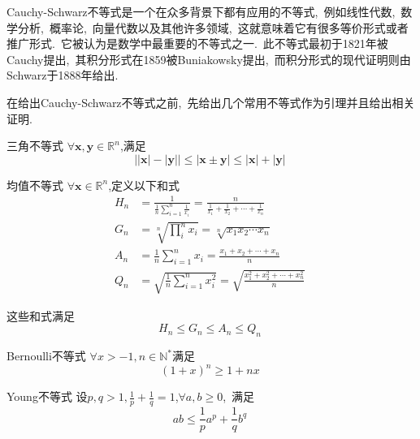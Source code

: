 
\begin{issues}
\end{issues}

Cauchy-Schwarz不等式是一个在众多背景下都有应用的不等式,\ 例如线性代数,\ 数学分析,\ 概率论,\ 向量代数以及其他许多领域,\ 这就意味着它有很多等价形式或者推广形式.\ 它被认为是数学中最重要的不等式之一.\ 此不等式最初于1821年被Cauchy提出,\ 其积分形式在1859被Buniakowsky提出,\ 而积分形式的现代证明则由Schwarz于1888年给出.\ 

在给出Cauchy-Schwarz不等式之前,\ 先给出几个常用不等式作为引理并且给出相关证明.\ 
\begin{lemma}{三角不等式}
$\forall \boldsymbol{x},\boldsymbol{y}\in\mathbb{R}^n$,满足
\begin{equation}
\lvert\lvert\boldsymbol{x}\rvert-\lvert\boldsymbol{y}\rvert\rvert\leqslant\lvert\boldsymbol{x}\pm\boldsymbol{y}\rvert\leqslant\lvert\boldsymbol{x}\rvert+\lvert\boldsymbol{y}\rvert~
\end{equation}
\end{lemma}
\begin{lemma}{均值不等式}
$\forall \boldsymbol{x}\in\mathbb{R}^n$,定义以下和式
\begin{align}
H_n&=\frac{1}{\frac{1}{n}\sum\limits_{i=1}^n\frac{1}{x_i}}=\frac{n}{\frac{1}{x_1}+\frac{1}{x_2}+\cdots+\frac{1}{x_n}}\\
G_n&=\sqrt[n]{\prod_{i}^n x_i}=\sqrt[n]{x_1x_2\cdots x_n}\\
A_n&=\frac{1}{n}\sum_{i=1}^n x_i=\frac{x_1+x_2+\cdots+x_n}{n}\\
Q_n&=\sqrt{\frac{1}{n}\sum_{i=1}^n x_i^2}=\sqrt{\frac{x_1^2+x_2^2+\cdots+x_n^2}{n}}~
\end{align}
\end{lemma}
这些和式满足
\begin{equation}
H_n\leqslant G_n\leqslant A_n \leqslant Q_n~
\end{equation}
\begin{lemma}{Bernoulli不等式}
$\forall x > -1,n \in \mathbb{N}^{\ast}$满足
\begin{equation}
(1+x)^n \geq 1+nx~
\end{equation}
\end{lemma}
\begin{lemma}{Young不等式}
设$p,q>1,\frac{1}{p}+\frac{1}{q}=1$,$\forall a,b\geqslant 0$,\ 满足 
\begin{equation}
a b \leqslant \frac{1}{p}a^{p}+\frac{1}{q}b^{q}~
\end{equation}
\end{lemma}
